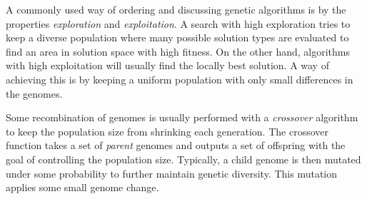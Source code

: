 A commonly used way of ordering and discussing genetic algorithms is by the properties \textit{exploration} and \textit{exploitation}. A search with high exploration tries to keep a diverse population where many possible solution types are evaluated to find an area in solution space with high fitness. On the other hand, algorithms with high exploitation will usually find the locally best solution. A way of achieving this is by keeping a uniform population with only small differences in the genomes.

Some recombination of genomes is usually performed with a \textit{crossover} algorithm to keep the population size from shrinking each generation.  The crossover function takes a set of \textit{parent} genomes and outputs a set of offspring with the goal of controlling the population size.  Typically, a child genome is then mutated under some probability to further maintain genetic diversity. This mutation applies some small genome change.

